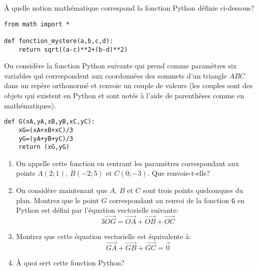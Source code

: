 \begin{exercise}
	À quelle notion mathématique correspond la fonction Python définie ci-dessous?
	\begin{center}
		\begin{varwidth}[t]{.5\textwidth}
			\begin{lstlisting}[language=iPython,linewidth = 9cm]
from math import *

def fonction_mystere(a,b,c,d):
    return sqrt((a-c)**2+(b-d)**2)
\end{lstlisting}\end{varwidth}
	\end{center}
\end{exercise}

\begin{exercise}
	On considère la fonction Python suivante qui prend comme paramètres six variables qui correspondent aux coordonnées des sommets d'un triangle $ABC$ dans un repère orthonormé et renvoie un couple de valeurs (les couples sont des objets qui existent en Python et sont notés à l'aide de parenthèses comme en mathématiques).
	\begin{center}
		\begin{varwidth}[t]{.5\textwidth}
			\begin{lstlisting}[language=iPython,linewidth = 7cm]
def G(xA,yA,xB,yB,xC,yC):
    xG=(xA+xB+xC)/3
    yG=(yA+yB+yC)/3
    return (xG,yG)
\end{lstlisting}\end{varwidth}\end{center}
	\begin{enumerate}
		\item On appelle cette fonction en rentrant les paramètres correspondant aux points $A(2;1)$, $B(-2;5)$ et $C(0;-3)$. Que renvoie-t-elle?
		\item On considère maintenant que $A$, $B$ et $C$ sont trois points quelconques du plan. Montrez que le point $G$ correspondant au renvoi de la fonction \texttt{G} en Python est défini par l'équation vectorielle suivante:
		$$3\overrightarrow{OG}=\overrightarrow{OA}+\overrightarrow{OB}+\overrightarrow{OC}$$
		\item Montrez que cette équation vectorielle est équivalente à:
		$$\overrightarrow{GA}+\overrightarrow{GB}+\overrightarrow{GC}=\overrightarrow{0}$$
		\item À quoi sert cette fonction Python?
	\end{enumerate}
\end{exercise}

